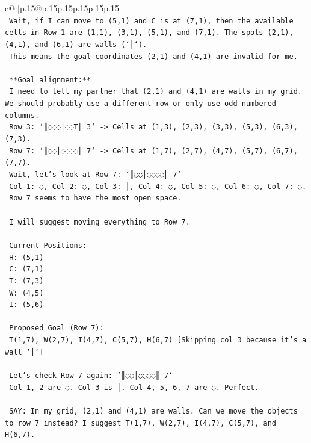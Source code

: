 \documentclass{article}
\begin{document}
{\begin{supertabular}{c@{$\;$}|p{.15\linewidth}@{}p{.15\linewidth}p{.15\linewidth}p{.15\linewidth}p{.15\linewidth}p{.15\linewidth}}
{{{\\ 
\texttt{    Wait, if I can move to (5,1) and C is at (7,1), then the available cells in Row 1 are (1,1), (3,1), (5,1), and (7,1). The spots (2,1), (4,1), and (6,1) are walls (`│`).} \\
\texttt{    This means the goal coordinates (2,1) and (4,1) are invalid for me.} \\
\\ 
\texttt{    **Goal alignment:**} \\
\texttt{    I need to tell my partner that (2,1) and (4,1) are walls in my grid. We should probably use a different row or only use odd{-}numbered columns.} \\
\texttt{    Row 3: `║◌◌◌│◌◌T║ 3` {-}> Cells at (1,3), (2,3), (3,3), (5,3), (6,3), (7,3).} \\
\texttt{    Row 7: `║◌◌│◌◌◌◌║ 7` {-}> Cells at (1,7), (2,7), (4,7), (5,7), (6,7), (7,7).} \\
\texttt{    Wait, let's look at Row 7: `║◌◌│◌◌◌◌║ 7`} \\
\texttt{    Col 1: ◌, Col 2: ◌, Col 3: │, Col 4: ◌, Col 5: ◌, Col 6: ◌, Col 7: ◌.} \\
\texttt{    Row 7 seems to have the most open space.} \\
\\ 
\texttt{    I will suggest moving everything to Row 7.} \\
\\ 
\texttt{    Current Positions:} \\
\texttt{    H: (5,1)} \\
\texttt{    C: (7,1)} \\
\texttt{    T: (7,3)} \\
\texttt{    W: (4,5)} \\
\texttt{    I: (5,6)} \\
\\ 
\texttt{    Proposed Goal (Row 7):} \\
\texttt{    T(1,7), W(2,7), I(4,7), C(5,7), H(6,7) {[}Skipping col 3 because it's a wall `│`{]}} \\
\\ 
\texttt{    Let's check Row 7 again: `║◌◌│◌◌◌◌║ 7`} \\
\texttt{    Col 1, 2 are ◌. Col 3 is │. Col 4, 5, 6, 7 are ◌. Perfect.} \\
\\ 
\texttt{    SAY: In my grid, (2,1) and (4,1) are walls. Can we move the objects to row 7 instead? I suggest T(1,7), W(2,7), I(4,7), C(5,7), and H(6,7).} \\
            }
        }
    }
     \\ \\


\end{supertabular}}
\end{document}
